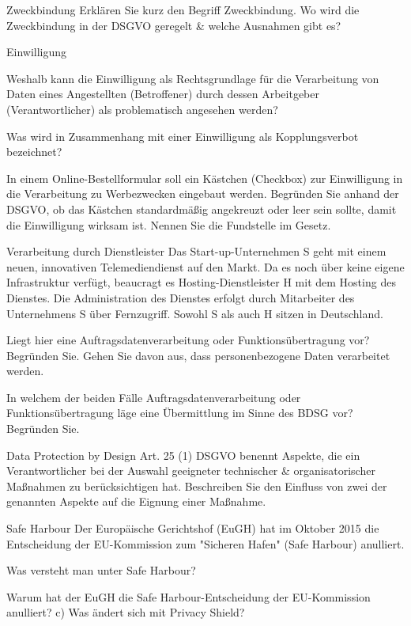 \documentclass{exercisesheet}
\begin{document}
\begin{exercise}{Zweckbindung}
  Erklären Sie kurz den Begriff Zweckbindung. Wo wird die Zweckbindung in der DSGVO geregelt \& welche Ausnahmen gibt es?
\end{exercise}

\begin{exercise**}{Einwilligung}
  \item Weshalb kann die Einwilligung als Rechtsgrundlage für die Verarbeitung von Daten eines Angestellten (Betroffener) durch dessen Arbeitgeber (Verantwortlicher) als problematisch angesehen werden?
  \item Was wird in Zusammenhang mit einer Einwilligung als Kopplungsverbot bezeichnet?
  \item In einem Online-Bestellformular soll ein Kästchen (Checkbox) zur Einwilligung in die Verarbeitung zu Werbezwecken eingebaut werden. Begründen Sie anhand der DSGVO, ob das Kästchen standardmäßig angekreuzt oder leer sein sollte, damit die Einwilligung wirksam ist. Nennen Sie die Fundstelle im Gesetz.
\end{exercise**}

\begin{exercise*}{Verarbeitung durch Dienstleister}{
    Das Start-up-Unternehmen S geht mit einem neuen, innovativen Telemediendienst auf den Markt. Da es noch über keine eigene Infrastruktur verfügt, beaucragt es Hosting-Dienstleister H mit dem Hosting des Dienstes. Die Administration des Dienstes erfolgt durch Mitarbeiter des Unternehmens S über Fernzugriff. Sowohl S als auch H sitzen in Deutschland.
  }
  \item Liegt hier eine Auftragsdatenverarbeitung oder Funktionsübertragung vor? Begründen Sie. Gehen Sie davon aus, dass personenbezogene Daten verarbeitet werden.
  \item In welchem der beiden Fälle Auftragsdatenverarbeitung oder Funktionsübertragung läge eine Übermittlung im Sinne des BDSG vor? Begründen Sie.
\end{exercise*}

\begin{exercise}{Data Protection by Design}
  Art. 25 (1) DSGVO benennt Aspekte, die ein Verantwortlicher bei der Auswahl geeigneter technischer \& organisatorischer Maßnahmen zu berücksichtigen hat. Beschreiben Sie den Einfluss von zwei der genannten Aspekte auf die Eignung einer Maßnahme.
\end{exercise}

\begin{exercise*}{Safe Harbour}{
    Der Europäische Gerichtshof (EuGH) hat im Oktober 2015 die Entscheidung der EU-Kommission zum "Sicheren Hafen" (Safe Harbour) anulliert.
  }
  \item Was versteht man unter Safe Harbour?
  \item Warum hat der EuGH die Safe Harbour-Entscheidung der EU-Kommission anulliert? c) Was ändert sich mit Privacy Shield?
\end{exercise*}
\end{document}
